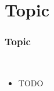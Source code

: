 \section{Topic}

\begin{frame}
  \frametitle{Topic}
  \begin{description}[]
	 \item[TODO] \hfill \\
	 \begin{itemize}
   	\item TODO
    \end{itemize}
  \end{description}
\end{frame}